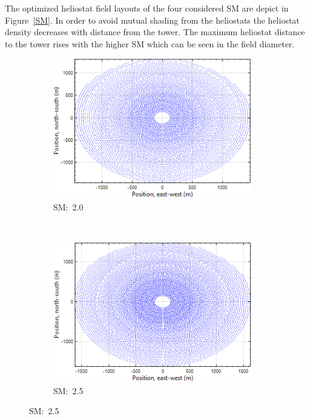 The optimized heliostat field layouts of the four considered SM are depict in Figure~\ref{SM}. In order to avoid mutual shading from the heliostats the heliostat density decreases with distance from the tower. The maximum heliostat distance to the tower rises with the higher SM which can be seen in the field diameter. 
\begin{figure}[!htbp]
        \centering   
        \begin{subfigure}[b]{0.5\textwidth}
                \centering
                \includegraphics[width=0.95\textwidth]{FIG/SM20}
                \caption{SM:~2.0}\label{SM2.0}
        \end{subfigure}%
        ~
        \begin{subfigure}[b]{0.5\textwidth}
                \centering
                \includegraphics[width=0.95\textwidth]{FIG/SM25}
                \caption{SM:~2.5}\label{SM2.5}
        \end{subfigure}
        

\end{figure}
